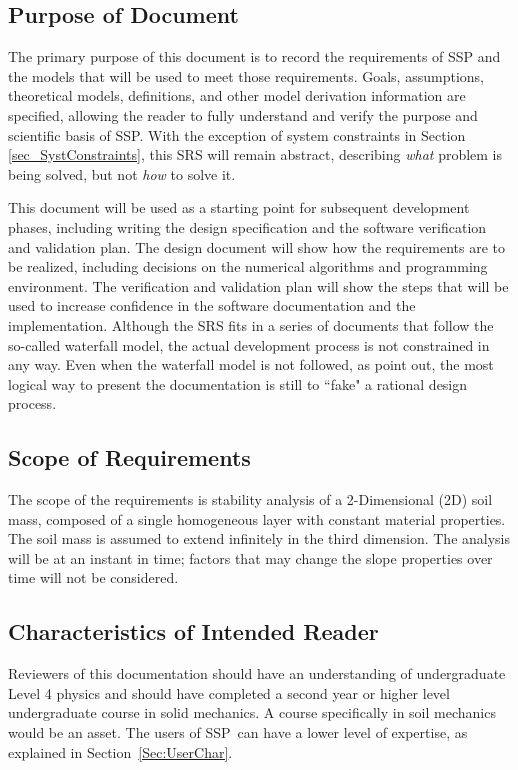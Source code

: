 \documentclass[12pt]{article}
\newcommand{\progname}{SSP}
\begin{document}
\subsection{Purpose of Document}

The primary purpose of this document is to record the requirements of  
\progname{} and the models that will be used to meet those requirements. Goals, 
 assumptions,  theoretical models, definitions, and other model derivation 
 information are specified, allowing the reader to fully understand and verify 
 the purpose and scientific basis of \progname. With the exception of system 
 constraints in Section \ref{sec_SystConstraints}, this SRS will remain 
 abstract, describing \textit{what} problem is being solved, but not 
 \textit{how} to solve it.
~\newline

\noindent This document will be used as a starting point for subsequent 
development 
phases, including writing the design specification and the software verification
 and validation plan. The design document will show how the requirements
 are to be realized, including decisions on the numerical algorithms and 
programming environment. The verification and validation plan will show
 the steps that will be used to increase confidence in the software 
 documentation
 and the implementation. Although the SRS fits in a series of documents 
that follow the so-called waterfall model, the actual development process
 is not constrained in any way. Even when the waterfall model is not followed, 
as \cite{ParnasAndClements1986} point out, the most logical 
way to present the documentation is still to ``fake" a rational design process.

\subsection{Scope of Requirements} 

The scope of the requirements is stability analysis of a 2-Dimensional (2D)
soil mass, composed of a single homogeneous layer with constant material 
properties. The soil mass is assumed to extend infinitely in the third 
dimension. The analysis will be at an instant in time; factors that may change 
the slope properties over time will not be considered.

\subsection{Characteristics of Intended Reader}
\label{Sec:CharofInteRead}
Reviewers of this documentation should have an understanding of undergraduate 
Level 4 physics and should have completed a second year or higher level 
undergraduate course in solid mechanics. A course specifically in soil 
mechanics would be an asset. The users of \progname\ can have a 
lower level of expertise, as explained in Section~\ref{Sec:UserChar}.
\end{document}
